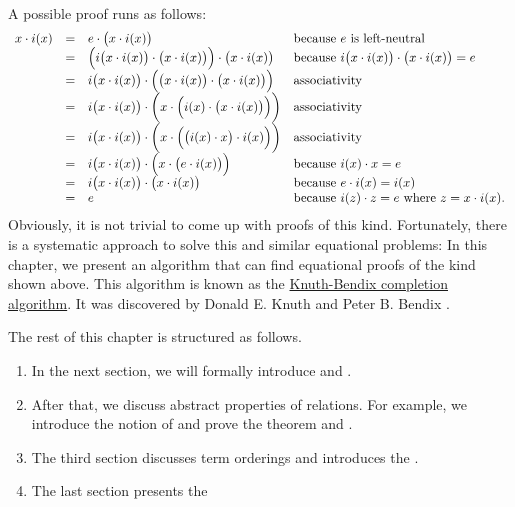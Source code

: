 \\[0.2cm]
A possible proof runs as follows:
$$
\begin{array}{lcll}
  x \cdot i(x) & = & e \cdot \bigl(x \cdot i(x)\bigr) & \mbox{because $e$ is left-neutral} \\
               & = & \Bigl(i\bigl(x \cdot i(x)\bigr) \cdot \bigl(x \cdot i(x)\bigr)\Bigr) \cdot \bigl(x \cdot i(x)\bigr)
                   & \mbox{because $i\bigl(x \cdot i(x)\bigr) \cdot \bigl(x \cdot i(x)\bigr) = e$} \\
               & = & i\bigl(x \cdot i(x)\bigr) \cdot \Bigl(\bigl(x \cdot i(x)\bigr) \cdot \bigl(x \cdot i(x)\bigr)\Bigr)
                   &  \mbox{associativity} \\
               & = & i\bigl(x \cdot i(x)\bigr) \cdot \biggl(x \cdot \Bigl(i(x) \cdot \bigl(x \cdot i(x)\bigr)\Bigr)\biggr) 
                   &  \mbox{associativity} \\
               & = & i\bigl(x \cdot i(x)\bigr) \cdot \biggl(x \cdot \Bigl(\bigl(i(x) \cdot x\bigr) \cdot i(x)\Bigr)\biggr) 
                   &  \mbox{associativity} \\
               & = & i\bigl(x \cdot i(x)\bigr) \cdot \Bigl(x \cdot \bigl(e \cdot i(x)\bigr)\Bigr) 
                   &  \mbox{because $i(x) \cdot x = e$} \\
               & = & i\bigl(x \cdot i(x)\bigr) \cdot \bigl(x \cdot i(x)\bigr) 
                   &  \mbox{because $e \cdot i(x) = i(x)$} \\
               & = & e 
                   & \mbox{because $i(z) \cdot z = e$ where $z = x \cdot i(x)$.}
\end{array}
$$
Obviously, it is not trivial to come up with proofs of this kind.  Fortunately, there is a systematic approach to
solve this and similar equational problems: In this chapter, we present an algorithm
that can find equational proofs of the kind shown above.  This algorithm is known as the
\href{https://en.wikipedia.org/wiki/Knuth–Bendix_completion_algorithm}{Knuth-Bendix completion algorithm}.  It
was discovered by Donald E. Knuth and Peter B. Bendix \cite{knuth:1970}.

The rest of this chapter is structured as follows.
\begin{enumerate}
\item In the next section, we will formally introduce  and .
\item After that, we discuss abstract properties of relations.  For example, we introduce the notion of 
       and prove the  theorem and .
\item The third section discusses term orderings and introduces the .
\item The last section presents the       
\end{enumerate}

